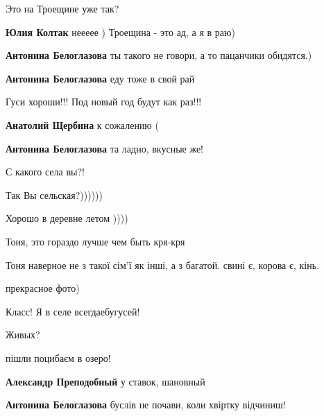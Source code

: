 \begin{itemize}

Это на Троещине уже так?


\textbf{Юлия Колтак} неееее ) Троещина - это ад, а я в раю)


\textbf{Антонина Белоглазова} ты такого не говори, а то пацанчики обидятся.)


\textbf{Антонина Белоглазова} еду тоже в свой рай


Гуси хороши!!! Под новый год будут как раз!!!


\textbf{Анатолий Щербина} к сожалению (


\textbf{Антонина Белоглазова} та ладно, вкусные же!


С какого села вы?!


Так Вы сельская?))))))


Хорошо в деревне летом ))))


Тоня, это гораздо лучше чем быть кря-кря


Тоня наверное не з такої сім'ї як інші, а з багатой. свині є, корова є, кінь.

прекрасное фото)


Класс! Я в селе всегдаебугусей!


Живых?


пішли поцибаєм в озеро!


\textbf{Александр Преподобный} у ставок, шановный


\textbf{Антонина Белоглазова} буслів не почави, коли хвіртку відчиниш!


\end{itemize}
